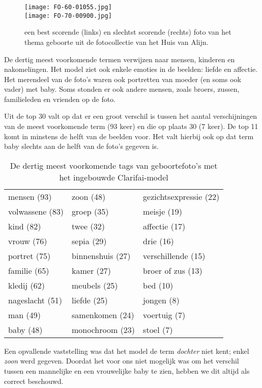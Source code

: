 \begin{figure}
	\centering
	\texttt{[image: FO-60-01055.jpg]}\hfill
    \\[\smallskipamount]
	\texttt{[image: FO-70-00900.jpg]}\hfill
	\caption[Best en slechtst scorende foto van thema geboorte]{een best scorende (links) en slechtst scorende (rechts) foto van het thema geboorte uit de fotocollectie van het Huis van Alijn.}
\end{figure}

De dertig meest voorkomende termen verwijzen naar mensen, kinderen en nakomelingen. Het model ziet ook enkele emoties in de beelden: liefde en affectie. Het merendeel van de foto’s waren ook portretten van moeder (en soms ook vader) met baby. Soms stonden er ook andere mensen, zoals broers, zussen, familieleden en vrienden op de foto. 

Uit de top 30 valt op dat er een groot verschil is tussen het aantal verschijningen van de meest voorkomende term (93 keer) en die op plaats 30 (7 keer). De top 11 komt in minstens de helft van de beelden voor. Het valt hierbij ook op dat term baby slechts aan de helft van de foto’s gegeven is.

\begin{table}
	\centering
	\begin{tabular}{*{3}{l}}
		mensen (93) & zoon (48) & gezichtsexpressie (22) \\
		volwassene (83) & 	groep (35) & meisje (19) \\
		kind (82) & twee (32) & affectie (17) \\
		vrouw (76) & sepia (29) & drie (16) \\
		portret (75) & binnenshuis (27) & verschillende (15) \\
		familie (65) & 	kamer (27) & broer of zus (13) \\
		kledij (62) & 	meubels (25) & bed (10) \\
		nageslacht (51) & liefde (25) & jongen (8) \\
		man (49) & samenkomen (24) & voertuig (7) \\
		baby (48) & monochroom (23) & stoel (7) \\	
	\end{tabular}
	\caption{De dertig meest voorkomende tags van geboortefoto's met het ingebouwde Clarifai-model}
	\label{tab:30-termen-geboorte}
\end{table}

Een opvallende vaststelling was dat het model de term \textit{dochter} niet kent; enkel \textit{zoon} werd gegeven. Doordat het voor ons niet mogelijk was om het verschil tussen een mannelijke en een vrouwelijke baby te zien, hebben we dit altijd als correct beschouwd.

